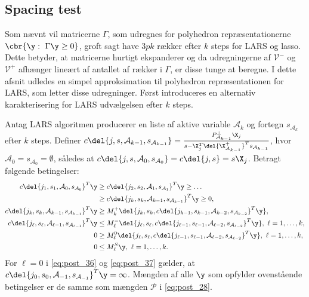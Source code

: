 \subsection{Spacing test}
Som nævnt vil matricerne \(\Gamma\), som udregnes for polyhedron repræsentationerne \(\cbr{\y : \ \Gamma \y \geq 0}\), groft sagt have \(3pk\) rækker efter \(k\) steps for LARS og lasso.
Dette betyder, at matricerne hurtigt ekspanderer og da udregningerne af \(\mathcal{V}^-\) og \(\mathcal{V}^+\) afhænger lineært af antallet af rækker i \(\Gamma\), er disse tunge at beregne.
I dette afsnit udledes en simpel approksimation til polyhedron repræsentationen for LARS, som letter disse udregninger. 
Først introduceres en alternativ karakterisering for LARS udvælgelsen efter \(k\) steps.
%
\begin{lem} \label{lem:post_lem5}
Antag LARS algoritmen producerer en liste af aktive variable \(\mathcal{A}_k\) og fortegn \(s_{\mathcal{A}_k}\) efter \(k\) steps.
Definer \(c \del{j, s, \mathcal{A}_{k-1}, s_{\mathcal{A}_{k-1}}} = \frac{P_{\mathcal{A}_{k-1}}^\perp \X_{j}}{s - \X_{j}^T \del{\X_{\mathcal{A}_{k-1}}^+}^T s_{\mathcal{A}_{k-1}}}\), hvor \(\mathcal{A}_0 = s_{\mathcal{A}_0} = \emptyset\), således at \(c \del{j, s, \mathcal{A}_{0}, s_{\mathcal{A}_0}} = c \del{j,s} = s \X_j\).
Betragt følgende betingelser:
\begin{align}
c \del{j_1, s_1, \mathcal{A}_0, s_{\mathcal{A}_0}}^T \y &\geq c \del{j_2, s_2, \mathcal{A}_1, s_{\mathcal{A}_1}}^T \y \geq \dots \nonumber \\
&\geq  c \del{j_k, s_k, \mathcal{A}_{k-1}, s_{\mathcal{A}_{k-1}}}^T \y \geq 0, \label{eq:post_34} \\
c \del{j_k, s_k, \mathcal{A}_{k-1}, s_{\mathcal{A}_{k-1}}}^T \y &\geq M_k^+ \del{j_k, s_k, c \del{j_{k-1}, s_{k-1}, \mathcal{A}_{k-2}, s_{\mathcal{A}_{k-2}}}^T \y}, \label{eq:post_35} \\
c \del{j_\ell, s_\ell, \mathcal{A}_{\ell-1}, s_{\mathcal{A}_{\ell-1}}}^T \y &\leq M_\ell^- \del{j_\ell, s_\ell, c \del{j_{\ell-1}, s_{\ell-1}, \mathcal{A}_{\ell-2}, s_{\mathcal{A}_{\ell-2}}}^T \y}, \ \ell = 1, \ldots, k, \label{eq:post_36} \\
0 &\geq M_\ell^0 \del{j_\ell, s_\ell, c \del{j_{\ell-1}, s_{\ell-1}, \mathcal{A}_{\ell-2}, s_{\mathcal{A}_{\ell-2}}}^T \y}, \ \ell = 1, \ldots, k, \label{eq:post_37} \\
0 &\leq M_\ell^S \y,  \ \ell = 1, \ldots, k. \label{eq:post_38}
\end{align}
For \(\ell = 0\) i \eqref{eq:post_36} og \eqref{eq:post_37} gælder, at \(c \del{j_0, s_0, \mathcal{A}_{-1}, s_{\mathcal{A}_{-1}}}^T \y = \infty\).
Mængden af alle \(\y\) som opfylder ovenstående betingelser er de samme som mængden \(\mathcal{P}\) i \eqref{eq:post_28}.


\end{lem}
